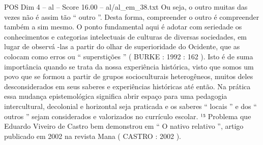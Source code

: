 \begin{textsample}{POS Dim 4 – al – Score 16.00 – al/al\_em\_38.txt}
Ou seja, o outro muitas das vezes não é assim tão “ outro ”.
Desta forma, compreender o outro é compreender também a sim mesmo.
O ponto fundamental aqui é adotar com seriedade os conhecimentos e categorias intelectuais de culturas de diversas sociedades, em lugar de observá -las a partir do olhar de superioridade do Ocidente, que as colocam como erros ou “ superstições ” ( BURKE : 1992 : 162 ).
Isto é de suma importância quando se trata da nossa experiência histórica, visto que somos um povo que se formou a partir de grupos socioculturais heterogêneos, muitos deles desconsiderados em seus saberes e experiências históricas até então.
Na prática essa mudança epistemológica significa abrir espaço para uma pedagogia intercultural, decolonial e horizontal seja praticada e os saberes “ locais ” e dos “ outros ” sejam considerados e valorizados no currículo escolar. ¹⁵ Problema que Eduardo Viveiro de Castro bem demonstrou em “ O nativo relativo ”, artigo publicado em 2002 na revista Mana ( CASTRO : 2002 ).

\end{textsample}
